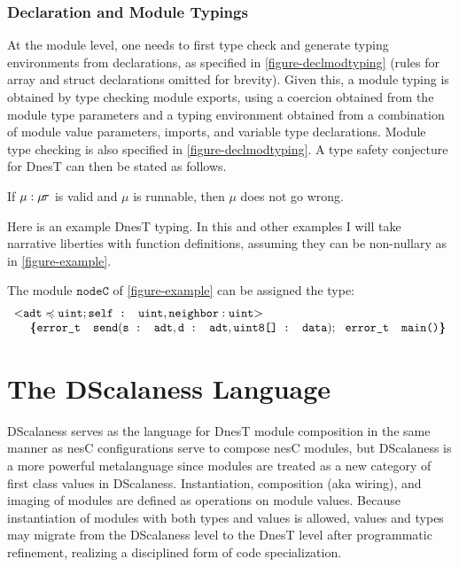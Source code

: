 \subsubsection{Declaration and Module Typings}

At the module level, one needs to first type check and generate typing environments from
declarations, as specified in \autoref{figure-declmodtyping} (rules for array and struct
declarations omitted for brevity). Given this, a module typing is obtained by type checking
module exports, using a coercion obtained from the module type parameters and a typing
environment obtained from a combination of module value parameters, imports, and variable type
declarations. Module type checking is also specified in \autoref{figure-declmodtyping}. A type
safety conjecture for DnesT can then be stated as follows.

\declmodtypingfig

\begin{conject}
  If $\mu : \mu\!\tau$ is valid and $\mu$ is runnable, then $\mu$ does not go wrong.
\end{conject}
Here is an example DnesT typing. In this and other examples I will take narrative liberties with
function definitions, assuming they can be non-nullary as in \autoref{figure-example}.
\begin{example}
\label{example-nesttyping}
The module $\texttt{nodeC}$ of \autoref{figure-example} can be assigned the type:
$$
\begin{array}{l}
\margs{\tt{adt} \subtype \tt{uint}; \texttt{self : uint}, \tt{neighbor : uint}}\\
\ \ \ \ \lc
\texttt{error\_t\ \ send}(\texttt{s : adt}, \texttt{d : adt}, \texttt{uint8[] : data});\ \ 
\texttt{error\_t\ \  main()} 
\rc
\end{array}
$$
\end{example}


\section{The DScalaness Language}
\label{section-scalaness-theory}

DScalaness serves as the language for DnesT module composition in the same manner as nesC
configurations serve to compose nesC modules, but DScalaness is a more powerful metalanguage
since modules are treated as a new category of first class values in DScalaness. Instantiation,
composition (aka wiring), and imaging of modules are defined as operations on module values.
Because instantiation of modules with both types and values is allowed, values and types may
migrate from the DScalaness level to the DnesT level after programmatic refinement, realizing a
disciplined form of code specialization.

